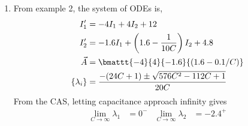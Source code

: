 \begin{enumerate}
    \item From example 2, the system of ODEs is,
          \begin{align}
              I_1'          & = -4I_1 + 4I_2 + 12                                      \\
              I_2'          & = -1.6I_1 + \left( 1.6 - \frac{1}{10C} \right) I_2 + 4.8 \\
              \vec{A}       & = \bmattt{-4}{4}{-1.6}{(1.6 - 0.1/C)}                    \\
              \{\lambda_i\} & = \frac{-(24C + 1) \pm \sqrt{576C^2 - 112C + 1}}{20C}
          \end{align}
          From the CAS, letting capacitance approach infinity gives
          \begin{align}
              \lim_{C \rightarrow \infty}\lambda_1 & = 0^{-}    &
              \lim_{C \rightarrow \infty}\lambda_2 & = -2.4^{+}
          \end{align}
\end{enumerate}
